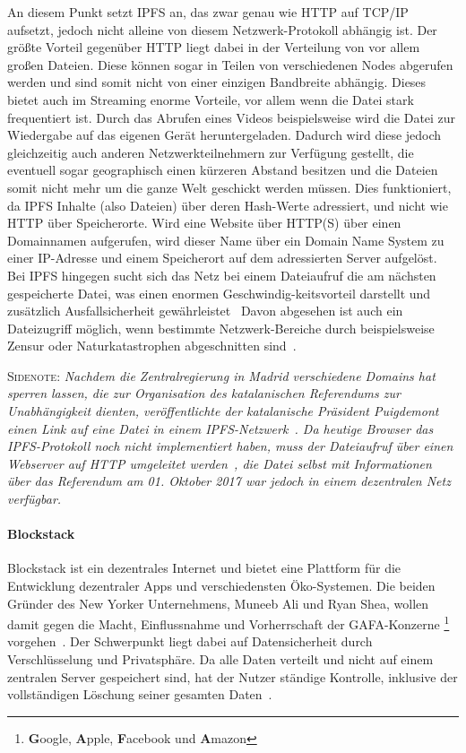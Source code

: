 An diesem Punkt setzt IPFS an, das zwar genau wie HTTP auf TCP/IP aufsetzt, jedoch nicht alleine von diesem Netzwerk-Protokoll abhängig ist. Der größte Vorteil gegenüber HTTP liegt dabei in der Verteilung von vor allem großen Dateien. Diese können sogar in Teilen von verschiedenen Nodes abgerufen werden und sind somit nicht von einer einzigen Bandbreite abhängig. Dieses bietet auch im Streaming enorme Vorteile, vor allem wenn die Datei stark frequentiert ist. Durch das Abrufen eines Videos beispielsweise wird die Datei zur Wiedergabe auf das eigenen Gerät heruntergeladen. Dadurch wird diese jedoch gleichzeitig auch anderen Netzwerkteilnehmern zur Verfügung gestellt, die eventuell sogar geographisch einen kürzeren Abstand besitzen und die Dateien somit nicht mehr um die ganze Welt geschickt werden müssen. Dies funktioniert, da IPFS Inhalte (also Dateien) über deren Hash-Werte adressiert, und nicht wie HTTP über Speicherorte. Wird eine Website über HTTP(S) über einen Domainnamen aufgerufen, wird dieser Name über ein Domain Name System zu einer IP-Adresse und einem Speicherort auf dem adressierten Server aufgelöst. Bei IPFS hingegen sucht sich das Netz bei einem Dateiaufruf die am nächsten gespeicherte Datei, was einen enormen Geschwindig-keitsvorteil darstellt und zusätzlich Ausfallsicherheit gewährleistet~\cite{CodersBlog.de.2019}
Davon abgesehen ist auch ein Dateizugriff möglich, wenn bestimmte Netzwerk-Bereiche durch beispielsweise Zensur oder Naturkatastrophen abgeschnitten sind~\cite{IdeasEngineering.2018}.

\smallskip

\textsc{Sidenote:}
\textit{
	Nachdem die Zentralregierung in Madrid verschiedene Domains hat sperren lassen, die zur Organisation des katalanischen Referendums zur Unabhängigkeit dienten, veröffentlichte der katalanische Präsident Puigdemont einen Link auf eine Datei in einem IPFS-Netzwerk~\cite{Winters.2017}. Da heutige Browser das IPFS-Protokoll noch nicht implementiert haben, muss der Dateiaufruf über einen Webserver auf HTTP umgeleitet werden~\cite{IdeasEngineering.2018}, die Datei selbst mit Informationen über das Referendum am 01. Oktober 2017 war jedoch in einem dezentralen Netz verfügbar.
}


\paragraph{Blockstack}

Blockstack ist ein dezentrales Internet und bietet eine Plattform für die Entwicklung dezentraler Apps und verschiedensten Öko-Systemen. Die beiden Gründer des New Yorker Unternehmens, Muneeb Ali und Ryan Shea, wollen damit gegen die Macht, Einflussnahme und Vorherrschaft der GAFA-Konzerne
\footnote{
	\textbf{G}oogle, \textbf{A}pple, \textbf{F}acebook und \textbf{A}mazon
}
vorgehen~\cite{Kyriasoglou.2018}. Der Schwerpunkt liegt dabei auf Datensicherheit durch Verschlüsselung und Privatsphäre. Da alle Daten verteilt und nicht auf einem zentralen Server gespeichert sind, hat der Nutzer ständige Kontrolle, inklusive der vollständigen Löschung seiner gesamten Daten~\cite{Kyriasoglou.2018}.


